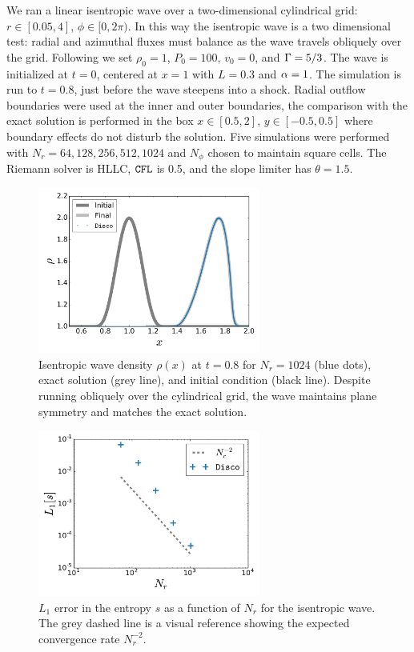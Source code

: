 We ran a linear isentropic wave over a two-dimensional cylindrical grid: $r\in[0.05,4]$, $\phi\in[0,2\pi)$.  In this way the isentropic wave is a two dimensional test: radial and azimuthal fluxes must balance as the wave travels obliquely over the grid.  Following \citet{Zhang06} we set $\rho_0 =1$, $P_0=100$, $v_0=0$, and $\Gamma=5/3$.  The wave is initialized at $t=0$, centered at $x=1$ with $L=0.3$ and $\alpha=1$.  The simulation is run to $t=0.8$, just before the wave steepens into a shock.  Radial outflow boundaries were used at the inner and outer boundaries, the comparison with the exact solution is performed in the box $x\in[0.5,2]$, $y\in[-0.5,0.5]$ where boundary effects do not disturb the solution. Five simulations were performed with $N_r = 64, 128, 256, 512, 1024$ and $N_\phi$ chosen to maintain square cells.  The Riemann solver is HLLC, ${\tt CFL}$ is 0.5, and the slope limiter has $\theta=1.5$.

\begin{figure}
\begin{center}
	\includegraphics[width=0.65\textwidth]{figures/numerics/isen_1024.png}
\end{center}
\caption{Isentropic wave density $\rho(x)$ at $t=0.8$ for $N_r=1024$ (blue dots), exact solution (grey line), and initial condition (black line).  Despite running obliquely over the cylindrical grid, the wave maintains plane symmetry and matches the exact solution. }
\end{figure}
\begin{figure}
\begin{center}
	\includegraphics[width=0.65\textwidth]{figures/numerics/isen_conv.pdf}
\end{center}
\caption{$L_1$ error in the entropy $s$ as a function of $N_r$ for the isentropic wave.  The grey dashed line is a visual reference showing the expected convergence rate $N^{-2}_r$.  }
\end{figure}

